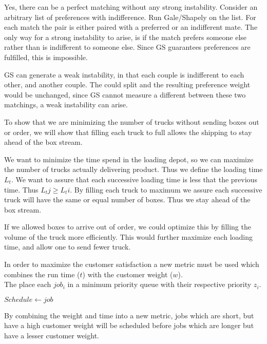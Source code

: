 \documentclass[12pt]{article}
\newenvironment{problem}[2][Problem]{\begin{trivlist}
\item[\hskip \labelsep {\bfseries #1}\hskip \labelsep {\bfseries #2.}]}{\end{trivlist}}
\begin{document}
\begin{problem}{1.5}
    Yes, there can be a perfect matching without any strong instability.
    Consider an arbitrary list of preferences with indifference. Run
    Gale/Shapely on the list. For each match the pair is either paired with
    a preferred or an indifferent mate. The only way for a strong instability to
    arise, is if the match prefers someone else rather than is indifferent to
    someone else. Since GS guarantees preferences are fulfilled, this is
    impossible.

    GS can generate a weak instability, in that each couple is indifferent to
    each other, and another couple. The could split and the resulting preference
    weight would be unchanged, since GS cannot measure a different between these
    two matchings, a weak instability can arise.
\end{problem}
\begin{problem}{4.3}
    To show that we are minimizing the number of trucks without sending boxes
    out or order, we will show that filling each truck to full allows the
    shipping to stay ahead of the box stream. 

    We want to minimize the time spend in the loading depot, so we can maximize
    the number of trucks actually delivering product. Thus we define the loading
    time $L_t$. We want to assure that each successive loading time is less that
    the previous time. Thus $L_tj \geq L_ti$.  By filling each truck to
    maximum we assure each successive truck will have the same or equal number
    of boxes. Thus we stay ahead of the box stream. 
    
    If we allowed boxes to arrive out of order, we could optimize this by
    filling the volume of the truck more efficiently. This would further
    maximize each loading time, and allow one to send fewer truck.
\end{problem}

\begin{problem}{4.13} 
In order to maximize the customer satisfaction a new metric must be used which
combines the run time ($t$) with the customer weight ($w$).
\begin{equation}
\end{equation}
The place each $job_i$ in a minimum priority queue with their respective priority
$z_i$.
\begin{algorithmic}
        \State $Schedule \gets job$
    \EndFor
\end{algorithmic}

By combining the weight and time into a new metric, jobs which are short, but
have a high customer weight will be scheduled before jobs which are longer but
have a lesser customer weight.
\end{problem}
 
\end{document}

